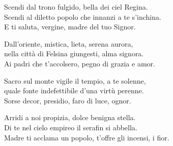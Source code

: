 
\strofa Scendi dal trono fulgido, bella dei ciel Regina.\\
Scendi al diletto popolo che innanzi a te s'inchina.\\
E ti saluta, vergine, madre del tuo Signor.

\spazio

 

\spazio

\strofa Dall'oriente, mistica, lieta, serena aurora,\\
nella città di Felsina giungesti, alma signora.\\
Ai padri che t'accolsero, pegno di grazia e amor.

\spazio


\spazio

\strofa Sacro sul monte vigile il tempio, a te solenne,\\
quale fonte indefettibile d'una virtù perenne.\\
Sorse decor, presidio, faro di luce, ognor.

\spazio


\spazio

\strofa Arridi a noi propizia, dolce benigna stella.\\
Di te nel cielo empireo il serafin si abbella.\\
Madre ti acclama un popolo, t'offre gli incensi, i fior.

\spazio


